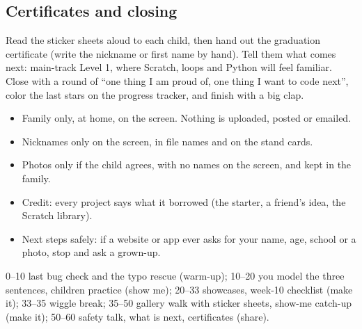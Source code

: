 \documentclass[track=junior,level=3,teacher]{kidscode}
\begin{document}
\subsection{Certificates and closing}
Read the sticker sheets aloud to each child, then hand out the graduation certificate (write the nickname
or first name by hand). Tell them what comes next: main-track Level 1, where Scratch, loops and Python will
feel familiar. Close with a round of \enquote{one thing I am proud of, one thing I want to code next},
color the last stars on the progress tracker, and finish with a big clap.

\begin{safety}
\begin{itemize}[itemsep=1pt]
  \item Family only, at home, on the screen. Nothing is uploaded, posted or emailed.
  \item Nicknames only on the screen, in file names and on the stand cards.
  \item Photos only if the child agrees, with no names on the screen, and kept in the family.
  \item Credit: every project says what it borrowed (the starter, a friend's idea, the Scratch library).
  \item Next steps safely: if a website or app ever asks for your name, age, school or a photo, stop and
        ask a grown-up.
\end{itemize}
\end{safety}

\begin{teachernote}
0--10 last bug check and the typo rescue (warm-up); 10--20 you model the three sentences, children
practice (show me); 20--33 showcases, week-10 checklist (make it); 33--35 wiggle break; 35--50 gallery
walk with sticker sheets, show-me catch-up (make it); 50--60 safety talk, what is next, certificates (share).
\end{teachernote}

\clearpage
\end{document}
